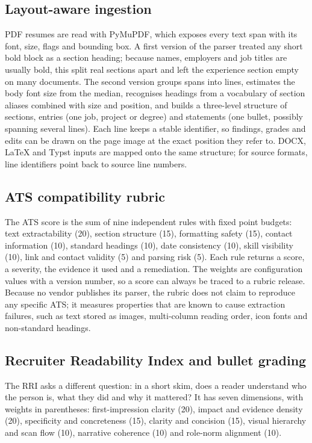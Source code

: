 \documentclass[3p,times,procedia]{elsarticle}
\begin{document}
\subsection{Layout-aware ingestion}
PDF resumes are read with PyMuPDF, which exposes every text span with its font, size, flags and bounding box. A first version of the parser treated any short bold block as a section heading; because names, employers and job titles are usually bold, this split real sections apart and left the experience section empty on many documents. The second version groups spans into lines, estimates the body font size from the median, recognises headings from a vocabulary of section aliases combined with size and position, and builds a three-level structure of sections, entries (one job, project or degree) and statements (one bullet, possibly spanning several lines). Each line keeps a stable identifier, so findings, grades and edits can be drawn on the page image at the exact position they refer to. DOCX, LaTeX and Typst inputs are mapped onto the same structure; for source formats, line identifiers point back to source line numbers.

\subsection{ATS compatibility rubric}
The ATS score is the sum of nine independent rules with fixed point budgets: text extractability (20), section structure (15), formatting safety (15), contact information (10), standard headings (10), date consistency (10), skill visibility (10), link and contact validity (5) and parsing risk (5). Each rule returns a score, a severity, the evidence it used and a remediation. The weights are configuration values with a version number, so a score can always be traced to a rubric release. Because no vendor publishes its parser, the rubric does not claim to reproduce any specific ATS; it measures properties that are known to cause extraction failures, such as text stored as images, multi-column reading order, icon fonts and non-standard headings.

\subsection{Recruiter Readability Index and bullet grading}
The RRI asks a different question: in a short skim, does a reader understand who the person is, what they did and why it mattered? It has seven dimensions, with weights in parentheses: first-impression clarity (20), impact and evidence density (20), specificity and concreteness (15), clarity and concision (15), visual hierarchy and scan flow (10), narrative coherence (10) and role-norm alignment (10).
\end{document}
